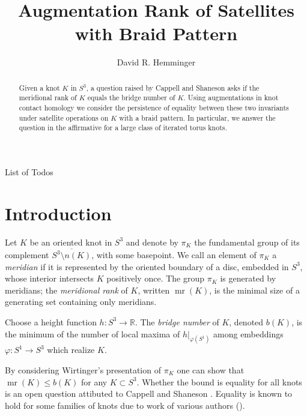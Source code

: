 \documentclass[11pt]{amsart}
\makeatletter
\def\R{{\mathbb R}}
\def\mr{\operatorname{mr}}
\theoremstyle{definition}
\def\listtodoname{List of Todos}
\def\listoftodos{\@starttoc{tdo}\listtodoname}
\makeatother
\begin{document}
\listoftodos


\title{Augmentation Rank of Satellites with Braid Pattern}

\author{David R. Hemminger}

\begin{abstract}
Given a knot $K$ in $S^3$, a question raised by Cappell and Shaneson asks if the meridional rank of $K$ equals the bridge number of $K$. Using augmentations in knot contact homology we consider the persistence of equality between these two invariants under satellite operations on $K$ with a braid pattern. In particular, we answer the question in the affirmative for a large class of iterated torus knots.
\end{abstract}

\maketitle



\section{Introduction}
Let $K$ be an oriented knot in $S^3$ and denote by $\pi_K$ the fundamental group of its complement $\overline{S^3\setminus n(K)}$, with some basepoint. We call an element of $\pi_K$ a \emph{meridian} if it is represented by the oriented boundary of a disc, embedded in $S^3$, whose interior intersects $K$ positively once. The group $\pi_K$ is generated by meridians; the \emph{meridional rank} of $K$, written $\mr(K)$, is the minimal size of a generating set containing only meridians. 

Choose a height function $h:S^3\to\R$. The \emph{bridge number} of $K$, denoted $b(K)$, is the minimum of the number of local maxima of $h|_{\varphi(S^1)}$ among embeddings $\varphi:S^1\to S^3$ which realize $K$.

By considering Wirtinger's presentation of $\pi_K$ one can show that $\mr(K)\le b(K)$ for any $K\subset S^3$. Whether the bound is equality for all knots is an open question attibuted to Cappell and Shaneson \cite[Prob. 1.11]{Kir95}. Equality is known to hold for some families of knots due to work of various authors (\cite{BZ,Cor13b,RZ}).
\end{document}
